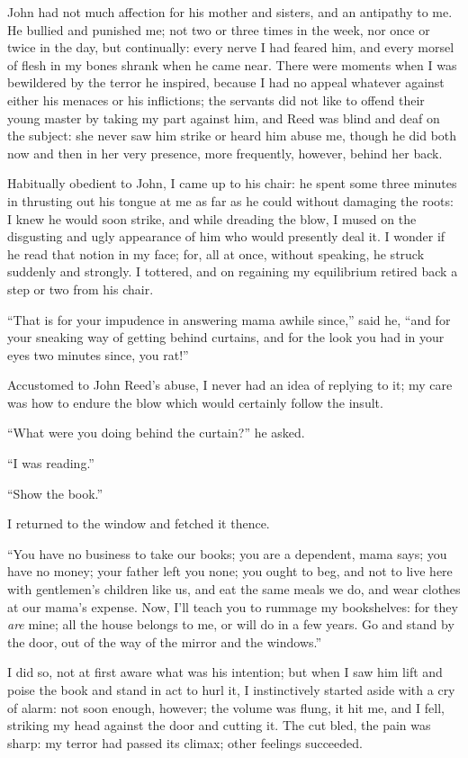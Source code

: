 John had not much affection for his mother and sisters, and an antipathy
to me. He bullied and punished me; not two or three times in the week,
nor once or twice in the day, but continually: every nerve I had feared
him, and every morsel of flesh in my bones shrank when he came near.
There were moments when I was bewildered by the terror he inspired,
because I had no appeal whatever against either his menaces or his
inflictions; the servants did not like to offend their young master by
taking my part against him, and \Mrs{} Reed was blind and deaf on the
subject: she never saw him strike or heard him abuse me, though he did
both now and then in her very presence, more frequently, however, behind
her back.

Habitually obedient to John, I came up to his chair: he spent some three
minutes in thrusting out his tongue at me as far as he could without
damaging the roots: I knew he would soon strike, and while dreading the
blow, I mused on the disgusting and ugly appearance of him who would
presently deal it. I wonder if he read that notion in my face; for, all
at once, without speaking, he struck suddenly and strongly. I tottered,
and on regaining my equilibrium retired back a step or two from his
chair.

\enquote{That is for your impudence in answering mama awhile since,}
said he, \enquote{and for your sneaking way of getting behind curtains,
	and for the look you had in your eyes two minutes since, you rat!}

Accustomed to John Reed's abuse, I never had an idea of replying to it;
my care was how to endure the blow which would certainly follow the
insult.

\enquote{What were you doing behind the curtain?} he asked.

\enquote{I was reading.}

\enquote{Show the book.}

I returned to the window and fetched it thence.

\enquote{You have no business to take our books; you are a dependent, mama
	says; you have no money; your father left you none; you ought to beg,
	and not to live here with gentlemen's children like us, and eat the same
	meals we do, and wear clothes at our mama's expense. Now, I'll teach
	you to rummage my bookshelves: for they \emph{are} mine; all the house
	belongs to me, or will do in a few years. Go and stand by the door, out
	of the way of the mirror and the windows.}

I did so, not at first aware what was his intention; but when I saw him
lift and poise the book and stand in act to hurl it, I instinctively
started aside with a cry of alarm: not soon enough, however; the volume
was flung, it hit me, and I fell, striking my head against the door and
cutting it. The cut bled, the pain was sharp: my terror had passed its
climax; other feelings succeeded.

